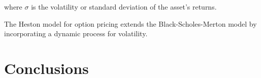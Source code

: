 \documentclass[a4paper,11pt]{article}
\begin{document}
where $\sigma$ is the volatility or standard deviation of the asset's returns.

The Heston model for option pricing extends the Black-Scholes-Merton model by incorporating
a dynamic process for volatility.


\section{Conclusions}
\label{sec:conclusions}























\end{document}
